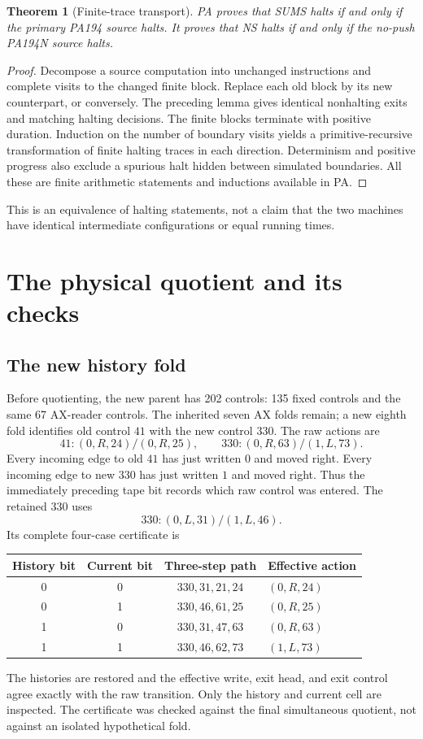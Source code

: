 \documentclass[11pt,a4paper]{article}
\newtheorem{theorem}{Theorem}
\begin{document}
\begin{theorem}[Finite-trace transport]
PA proves that SUMS halts if and only if the primary PA194 source halts.
It proves that NS halts if and only if the no-push PA194N source halts.
\end{theorem}
\begin{proof}
Decompose a source computation into unchanged instructions and complete
visits to the changed finite block. Replace each old block by its new
counterpart, or conversely. The preceding lemma gives identical
nonhalting exits and matching halting decisions. The finite blocks
terminate with positive duration. Induction on the number of boundary
visits yields a primitive-recursive transformation of finite halting
traces in each direction. Determinism and positive progress also exclude
a spurious halt hidden between simulated boundaries. All these are
finite arithmetic statements and inductions available in PA.
\end{proof}
This is an equivalence of halting statements, not a claim that the two
machines have identical intermediate configurations or equal running times.

\section{The physical quotient and its checks}
\subsection{The new history fold}
Before quotienting, the new parent has 202 controls: 135 fixed controls
and the same 67 AX-reader controls. The inherited seven AX folds remain;
a new eighth fold identifies old control $41$ with the new control $330$.
The raw actions are
\[
 41:(0,R,24)/(0,R,25),\qquad
 330:(0,R,63)/(1,L,73).
\]
Every incoming edge to old $41$ has just written $0$ and moved right.
Every incoming edge to new $330$ has just written $1$ and moved right.
Thus the immediately preceding tape bit records which raw control was
entered. The retained $330$ uses
\[
 330:(0,L,31)/(1,L,46).
\]
Its complete four-case certificate is
\begin{center}
\begin{tabular}{cccl}
\toprule
History bit & Current bit & Three-step path & Effective action\\
\midrule
0&0&$330,31,21,24$&$(0,R,24)$\\
0&1&$330,46,61,25$&$(0,R,25)$\\
1&0&$330,31,47,63$&$(0,R,63)$\\
1&1&$330,46,62,73$&$(1,L,73)$\\
\bottomrule
\end{tabular}
\end{center}
The histories are restored and the effective write, exit head, and exit
control agree exactly with the raw transition. Only the history and
current cell are inspected. The certificate was checked against the
final simultaneous quotient, not against an isolated hypothetical fold.
\end{document}
